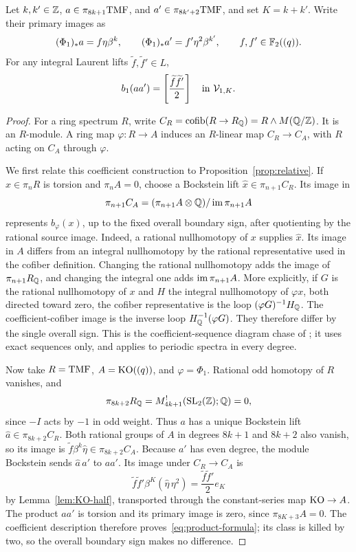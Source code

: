 \begin{proposition}\label{prop:product-formula}
Let $k,k'\in\mathbb Z$, $a\in\pi_{8k+1}\mathrm{TMF}$, and
$a'\in\pi_{8k'+2}\mathrm{TMF}$, and set $K=k+k'$.
Write their primary images as
\[
 (\Phi_1)_*a=f\eta\beta^k,\qquad
 (\Phi_1)_*a'=f'\eta^2\beta^{k'},\qquad
 f,f'\in\mathbb F_2((q)).
\]
For any integral Laurent lifts $\widetilde f,\widetilde f'\in L$,
\begin{equation}\label{eq:product-formula}
 b_1(aa')=\left[\frac{\widetilde f\widetilde f'}2\right]
          \quad\text{in }\mathcal V_{1,K}.
\end{equation}
\end{proposition}
\begin{proof}
For a ring spectrum $R$, write
$C_R=\operatorname{cofib}(R\to R_\mathbb Q)=R\wedge M(\mathbb Q/\mathbb Z)$.
It is an $R$-module. A ring map $\varphi:R\to A$ induces an
$R$-linear map $C_R\to C_A$, with $R$ acting on $C_A$ through
$\varphi$.

We first relate this coefficient construction to
Proposition~\ref{prop:relative}. If $x\in\pi_nR$ is torsion and
$\pi_nA=0$, choose a Bockstein lift
$\widehat x\in\pi_{n+1}C_R$. Its image in
\[
 \pi_{n+1}C_A=
 (\pi_{n+1}A\otimes\mathbb Q)/\operatorname{im}\pi_{n+1}A
\]
represents $b_\varphi(x)$, up to the fixed overall boundary sign,
after quotienting by the rational source image. Indeed, a rational
nullhomotopy of $x$ supplies $\widehat x$. Its image in $A$ differs
from an integral nullhomotopy by the rational representative used
in the cofiber definition. Changing the rational nullhomotopy adds
the image of $\pi_{n+1}R_\mathbb Q$, and changing the integral one adds
$\operatorname{im}\pi_{n+1}A$. More explicitly, if $G$ is the rational nullhomotopy of $x$ and
$H$ the integral nullhomotopy of $\varphi x$, both directed toward
zero, the cofiber representative is the loop
$(\varphi G)^{-1}H_\mathbb Q$. The coefficient-cofiber image is the inverse
loop $H_\mathbb Q^{-1}(\varphi G)$. They therefore differ by the single
overall sign. This is the coefficient-sequence diagram chase of \cite[Section~4.3, Lemma~4.4]{BN}; it uses exact sequences only,
and applies to periodic spectra in every degree.

Now take $R=\mathrm{TMF}$, $A=\mathrm{KO}((q))$, and $\varphi=\Phi_1$.
Rational odd homotopy of $R$ vanishes, and
\[
 \pi_{8k+2}R_\mathbb Q=M_{4k+1}^{!}(\mathrm{SL}_2(\mathbb Z);\mathbb Q)=0,
\]
since $-I$ acts by $-1$ in odd weight.
Thus $a$ has a unique Bockstein lift
$\widehat a\in\pi_{8k+2}C_R$. Both rational groups of $A$ in
degrees $8k+1$ and $8k+2$ also vanish, so its image is
$\widetilde f\beta^k\widehat\eta\in\pi_{8k+2}C_A$.
Because $a'$ has even degree, the module Bockstein sends
$\widehat a\,a'$ to $aa'$. Its image under $C_R\to C_A$ is
\[
 \widetilde f\widetilde f'\beta^K
       (\widehat\eta\,\eta^2)
   =\frac{\widetilde f\widetilde f'}2 e_K
\]
by Lemma~\ref{lem:KO-half}, transported through the constant-series
map $\mathrm{KO}\to A$. The product $aa'$ is torsion and its primary
image is zero, since $\pi_{8K+3}A=0$. The coefficient description
therefore proves~\eqref{eq:product-formula}; its class is killed
by two, so the overall boundary sign makes no difference.


\end{proof}
